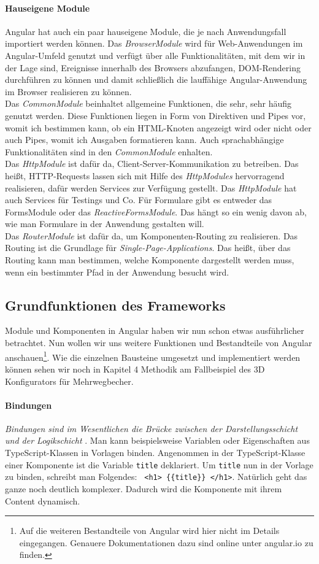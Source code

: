 \paragraph{Hauseigene Module}
Angular hat auch ein paar hauseigene Module, die je nach Anwendungsfall importiert werden können. Das \textit{BrowserModule} wird für Web-Anwendungen im Angular-Umfeld genutzt und verfügt über alle Funktionalitäten, mit dem wir in der Lage sind, Ereignisse innerhalb des Browsers abzufangen, DOM-Rendering durchführen zu können und damit schließlich die lauffähige Angular-Anwendung im Browser realisieren zu können.\\
Das \textit{CommonModule} beinhaltet allgemeine Funktionen, die sehr, sehr häufig genutzt werden. Diese Funktionen liegen in Form von Direktiven und Pipes vor, womit ich bestimmen kann, ob ein HTML-Knoten angezeigt wird oder nicht oder auch Pipes, womit ich Ausgaben formatieren kann. Auch sprachabhängige Funktionalitäten sind in den \textit{CommonModule} enhalten.\\
Das \textit{HttpModule} ist dafür da, Client-Server-Kommunikation zu betreiben. Das heißt, HTTP-Requests lassen sich mit Hilfe des \textit{HttpModules} hervorragend realisieren, dafür werden Services zur Verfügung gestellt. Das \textit{HttpModule} hat auch Services für Testings und Co. Für Formulare gibt es entweder das FormsModule oder das \textit{ReactiveFormsModule}. Das hängt so ein wenig davon ab, wie man Formulare in der Anwendung gestalten will.\\
Das \textit{RouterModule} ist dafür da, um Komponenten-Routing zu realisieren. Das Routing ist die Grundlage für \textit{Single-Page-Applications}. Das heißt, über das Routing kann man bestimmen, welche Komponente dargestellt werden muss, wenn ein bestimmter Pfad in der Anwendung besucht wird.
%
\subsection{Grundfunktionen des Frameworks}
\label{subsec:grundfunktionen}
%
Module und Komponenten in Angular haben wir nun schon etwas ausführlicher betrachtet. Nun wollen wir uns weitere Funktionen und Bestandteile von Angular anschauen\footnote{Auf die weiteren Bestandteile von Angular wird hier nicht im Details eingegangen. Genauere Dokumentationen dazu sind online unter angular.io zu finden.}. Wie die einzelnen Bausteine umgesetzt und implementiert werden können sehen wir noch in Kapitel 4 Methodik am Fallbeispiel des 3D Konfigurators für Mehrwegbecher.
%
\paragraph{Bindungen}
%
\textit{\glqq Bindungen sind im Wesentlichen die Brücke zwischen der Darstellungsschicht und der Logikschicht\grqq } \cite{unlu_angular_2018}. Man kann beispielsweise Variablen oder Eigenschaften aus TypeScript-Klassen in  Vorlagen binden. Angenommen in der TypeScript-Klasse einer Komponente ist die Variable \texttt{title} deklariert. Um \texttt{title} nun in der Vorlage zu binden, schreibt man Folgendes: \texttt{ <h1> \{\{title\}\} </h1>}. Natürlich geht das ganze noch deutlich komplexer. Dadurch wird die Komponente mit ihrem Content dynamisch.
%
